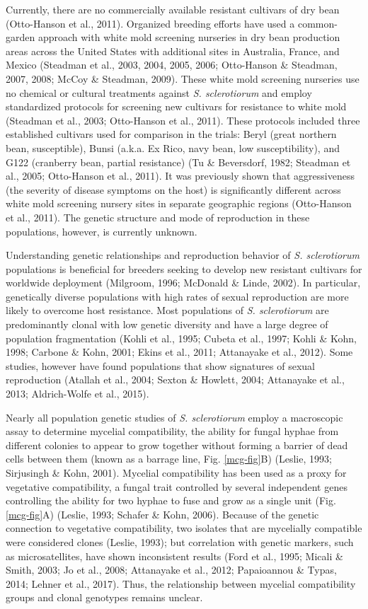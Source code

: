 \documentclass[fleqn,10pt,lineno]{wlpeerj} %
\theoremstyle{definition}
\theoremstyle{definition}
\theoremstyle{definition}
\theoremstyle{remark}
\begin{document}
Currently, there are no commercially available resistant cultivars of
dry bean (Otto-Hanson et al., 2011). Organized breeding efforts have
used a common-garden approach with white mold screening nurseries in dry
bean production areas across the United States with additional sites in
Australia, France, and Mexico (Steadman et al., 2003, 2004, 2005, 2006;
Otto-Hanson \& Steadman, 2007, 2008; McCoy \& Steadman, 2009). These
white mold screening nurseries use no chemical or cultural treatments
against \emph{S. sclerotiorum} and employ standardized protocols for
screening new cultivars for resistance to white mold (Steadman et al.,
2003; Otto-Hanson et al., 2011). These protocols included three
established cultivars used for comparison in the trials: Beryl (great
northern bean, susceptible), Bunsi (a.k.a. Ex Rico, navy bean, low
susceptibility), and G122 (cranberry bean, partial resistance) (Tu \&
Beversdorf, 1982; Steadman et al., 2005; Otto-Hanson et al., 2011). It
was previously shown that aggressiveness (the severity of disease
symptoms on the host) is significantly different across white mold
screening nursery sites in separate geographic regions (Otto-Hanson et
al., 2011). The genetic structure and mode of reproduction in these
populations, however, is currently unknown.

Understanding genetic relationships and reproduction behavior of
\emph{S. sclerotiorum} populations is beneficial for breeders seeking to
develop new resistant cultivars for worldwide deployment (Milgroom,
1996; McDonald \& Linde, 2002). In particular, genetically diverse
populations with high rates of sexual reproduction are more likely to
overcome host resistance. Most populations of \emph{S. sclerotiorum} are
predominantly clonal with low genetic diversity and have a large degree
of population fragmentation (Kohli et al., 1995; Cubeta et al., 1997;
Kohli \& Kohn, 1998; Carbone \& Kohn, 2001; Ekins et al., 2011;
Attanayake et al., 2012). Some studies, however have found populations
that show signatures of sexual reproduction (Atallah et al., 2004;
Sexton \& Howlett, 2004; Attanayake et al., 2013; Aldrich-Wolfe et al.,
2015).

Nearly all population genetic studies of \emph{S. sclerotiorum} employ a
macroscopic assay to determine mycelial compatibility, the ability for
fungal hyphae from different colonies to appear to grow together without
forming a barrier of dead cells between them (known as a barrage line,
Fig. \ref{mcg-fig}B) (Leslie, 1993; Sirjusingh \& Kohn, 2001). Mycelial
compatibility has been used as a proxy for vegetative compatibility, a
fungal trait controlled by several independent genes controlling the
ability for two hyphae to fuse and grow as a single unit (Fig.
\ref{mcg-fig}A) (Leslie, 1993; Schafer \& Kohn, 2006). Because of the
genetic connection to vegetative compatibility, two isolates that are
mycelially compatible were considered clones (Leslie, 1993); but
correlation with genetic markers, such as microsatellites, have shown
inconsistent results (Ford et al., 1995; Micali \& Smith, 2003; Jo et
al., 2008; Attanayake et al., 2012; Papaioannou \& Typas, 2014; Lehner
et al., 2017). Thus, the relationship between mycelial compatibility
groups and clonal genotypes remains unclear.
\end{document}
